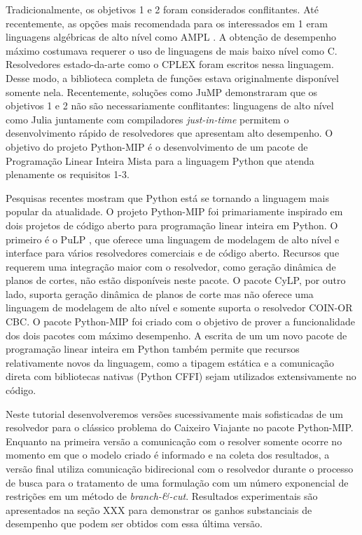 \documentclass[a4paper,11pt,fleqn]{article}
\begin{document}
Tradicionalmente, os objetivos 1 e 2 foram considerados conflitantes.
Até recentemente, as opções mais recomendada para os interessados
em 1 eram linguagens algébricas de alto nível como AMPL \citep{Fourer1987}.
A obtenção de desempenho máximo costumava requerer o uso de linguagens
de mais baixo nível como C\citep{Johnson1991a}. Resolvedores estado-da-arte
como o CPLEX foram escritos nessa linguagem\citep{Bixby2002}. Desse
modo, a biblioteca completa de funções estava originalmente 
disponível somente nela. Recentemente, soluções como JuMP\citep{Dunning2015}
demonstraram que os objetivos 1 e 2 não são necessariamente conflitantes:
linguagens de alto nível como Julia juntamente com compiladores \emph{just-in-time}
permitem o desenvolvimento rápido de resolvedores que apresentam alto
desempenho. O objetivo do projeto Python-MIP é o desenvolvimento de
um pacote de Programação Linear Inteira Mista para a linguagem Python
que atenda plenamente os requisitos 1-3.

Pesquisas recentes mostram que Python está se tornando a linguagem
mais popular da atualidade\citep{pythonEconomist2018}. O projeto Python-MIP
foi primariamente inspirado em dois projetos de código aberto para
programação linear inteira em Python. O primeiro é o PuLP \citep{Mitchell2009},
que oferece uma linguagem de modelagem de alto nível e interface para
vários resolvedores comerciais e de código aberto. Recursos que requerem 
uma integração maior com o resolvedor, como geração dinâmica de planos de cortes, não estão
disponíveis neste pacote. O pacote CyLP, por outro lado, suporta geração
dinâmica de planos de corte mas não oferece uma linguagem de modelagem
de alto nível\citep{Towhidi2016} e somente suporta o resolvedor COIN-OR
CBC\citep{Forrest2005}. O pacote Python-MIP foi criado com o objetivo
de prover a funcionalidade dos dois pacotes com máximo desempenho.
A escrita de um um novo pacote de programação linear inteira em Python
também permite que recursos relativamente novos da linguagem, como
a tipagem estática e a comunicação direta com bibliotecas nativas
(Python CFFI) sejam utilizados extensivamente no código.

Neste tutorial desenvolveremos versões sucessivamente mais sofisticadas
de um resolvedor para o clássico problema do Caixeiro Viajante\citep{Applegate2006} no
pacote Python-MIP. Enquanto na primeira versão a comunicação com o resolver 
somente ocorre no momento em que o modelo criado é informado e na coleta dos resultados, 
a versão final utiliza comunicação bidirecional com o resolvedor durante o processo de busca para o tratamento
de uma formulação com um número exponencial de restrições em um método de \emph{branch-\&-cut}. Resultados experimentais são apresentados na seção XXX 
para demonstrar os ganhos substanciais de desempenho que podem ser obtidos com essa última versão.
\end{document}
